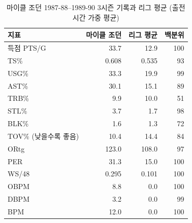 \begin{table}[!h]
\centering
\caption{마이클 조던 1987-88--1989-90 3시즌 기록과 리그 평균 (출전 시간 가중 평균)}
\label{tab:jordan}
\footnotesize
\begin{tabular}{@{}lrrr@{}}
\toprule
지표 & 마이클 조던 & 리그 평균 & 백분위 \\
\midrule
득점 PTS/G & 33.7 & 12.9 & 100 \\
TS\% & 0.608 & 0.535 & 93 \\
USG\% & 33.3 & 19.9 & 99 \\
AST\% & 30.1 & 15.1 & 89 \\
TRB\% & 9.9 & 10.0 & 51 \\
STL\% & 3.7 & 1.7 & 98 \\
BLK\% & 1.6 & 1.3 & 72 \\
TOV\% (낮을수록 좋음) & 10.4 & 14.4 & 84 \\
ORtg & 123.0 & 108.0 & 97 \\
PER & 31.3 & 15.0 & 100 \\
WS/48 & 0.295 & 0.101 & 100 \\
OBPM & 8.8 & 0.0 & 100 \\
DBPM & 3.2 & 0.0 & 99 \\
BPM & 12.0 & 0.0 & 100 \\
\bottomrule
\end{tabular}
\end{table}
